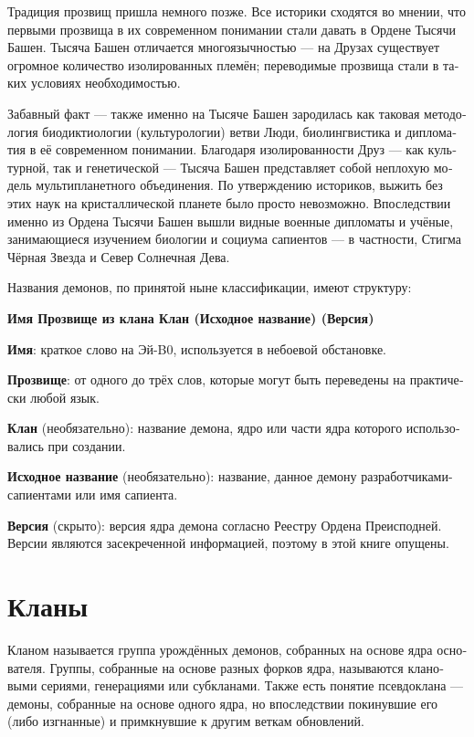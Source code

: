 \documentclass[a4paper,12pt,fleqn]{book}\usepackage{polyglossia}\setdefaultlanguage[babelshorthands=true]{russian}\setotherlanguage{english}\defaultfontfeatures{Ligatures=TeX,Mapping=tex-text}\usepackage{xcolor}\newcommand{\ml}[3]{#2}
\begin{document}
{Традиция прозвищ пришла немного позже.
Все историки сходятся во мнении, что первыми прозвища в их современном понимании стали давать в Ордене Тысячи Башен.
Тысяча Башен отличается многоязычностью --- на Друзах существует огромное количество изолированных племён;
переводимые прозвища стали в таких условиях необходимостью.

Забавный факт --- также именно на Тысяче Башен зародилась как таковая методология биодиктиологии (культурологии) ветви Люди, биолингвистика и дипломатия в её современном понимании.
Благодаря изолированности Друз --- как культурной, так и генетической --- Тысяча Башен представляет собой неплохую модель мультипланетного объединения.
По утверждению историков, выжить без этих наук на кристаллической планете было просто невозможно.
Впоследствии именно из Ордена Тысячи Башен вышли видные военные дипломаты и учёные, занимающиеся изучением биологии и социума сапиентов --- в частности, Стигма Чёрная Звезда и Север Солнечная Дева.

Названия демонов, по принятой ныне классификации, имеют структуру:

\textbf{Имя Прозвище из клана Клан (Исходное название) (Версия)}

\textbf{Имя}: краткое слово на Эй-B0, используется в небоевой обстановке.

\textbf{Прозвище}: от одного до трёх слов, которые могут быть переведены на практически любой язык.

\textbf{Клан} (необязательно): название демона, ядро или части ядра которого использовались при создании.

\textbf{Исходное название} (необязательно): название, данное демону разработчиками-сапиентами или имя сапиента.

\textbf{Версия} (скрыто): версия ядра демона согласно Реестру Ордена Преисподней.
Версии являются засекреченной информацией, поэтому в этой книге опущены.

\section{Кланы}

Кланом называется группа урождённых демонов, собранных на основе ядра основателя.
Группы, собранные на основе разных форков ядра, называются клановыми сериями, генерациями или субкланами.
Также есть понятие псевдоклана --- демоны, собранные на основе одного ядра, но впоследствии покинувшие его (либо изгнанные) и примкнувшие к другим веткам обновлений.

}
\end{document}
